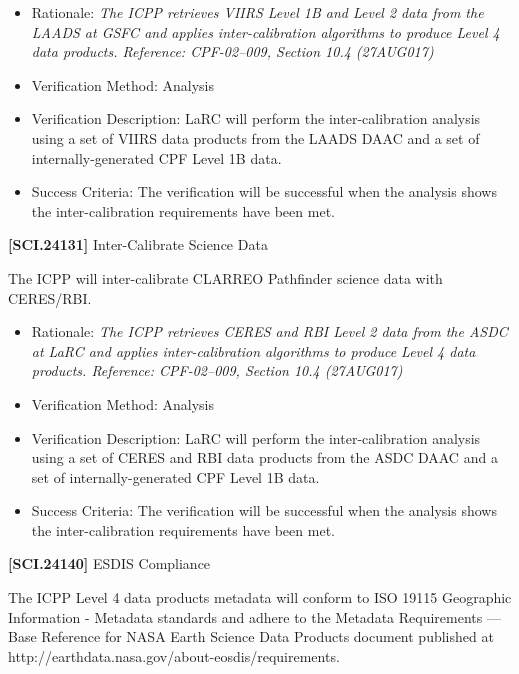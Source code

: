 \begin{itemize}
\item{} Rationale: \emph{The ICPP retrieves VIIRS Level 1B and Level 2 data from the LAADS at GSFC and applies inter-calibration algorithms to produce Level 4 data products. Reference: CPF-02--009, Section 10.4 (27AUG017)}

\item{} Verification Method: Analysis

\item{} Verification Description: \gls{LaRC} will perform the inter-calibration \gls{analysis} using a set of \gls{VIIRS} data products from the \gls{LAADS} \gls{DAAC} and a set of internally-generated \gls{CPF} Level 1B data.

\item{} Success Criteria: The verification will be successful when the \gls{analysis} shows the inter-calibration requirements have been met.

\end{itemize}

\textbf{[SCI.24131]} Inter-Calibrate Science Data

The \gls{ICPP} will inter-calibrate \gls{CLARREO} Pathfinder science data with \gls{CERES}\slash \gls{RBI}.

\begin{itemize}
\item{} Rationale: \emph{The ICPP retrieves CERES and RBI Level 2 data from the ASDC at LaRC and applies inter-calibration algorithms to produce Level 4 data products. Reference: CPF-02--009, Section 10.4 (27AUG017)}

\item{} Verification Method: Analysis

\item{} Verification Description: \gls{LaRC} will perform the inter-calibration \gls{analysis} using a set of \gls{CERES} and \gls{RBI} data products from the \gls{ASDC} \gls{DAAC} and a set of internally-generated \gls{CPF} Level 1B data.

\item{} Success Criteria: The verification will be successful when the \gls{analysis} shows the inter-calibration requirements have been met.

\end{itemize}

\textbf{[SCI.24140]} \gls{ESDIS} Compliance

The \gls{ICPP} Level 4 data products metadata will conform to ISO 19115 Geographic Information - Metadata standards and adhere to the Metadata Requirements --- Base Reference for NASA Earth Science Data Products document published at http:\slash \slash earthdata.nasa.gov\slash about-eosdis\slash requirements.

